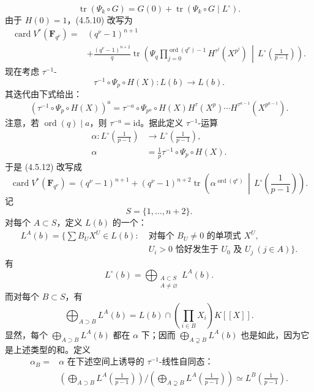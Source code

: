 \[
\operatorname{tr}(\Psi_k\circ G)=G(0)+\operatorname{tr}(\Psi_k\circ G\mid L^\circ).\tag{4.5.11}
\]
由于 $H(0)=1$，(4.5.10) 改写为
\[
\begin{aligned}
\operatorname{card}V^*(\mathbf F_{q^\nu})
={}&(q^\nu-1)^{n+1}\\
&+\frac{(q^\nu-1)^{n+2}}q\operatorname{tr}\left(
\Psi_q\prod_{j=0}^{\operatorname{ord}(q^\nu)-1}H^{\tau^j}(X^{p^j})\,\middle|\,
L^\circ\left(\frac1{p-1}\right)\right).
\end{aligned}\tag{4.5.12}
\]
现在考虑 $\tau^{-1}$-
\[
\tau^{-1}\circ\Psi_p\circ H(X):L(b)\longrightarrow L(b).\tag{4.5.13}
\]
其迭代由下式给出：
\[
(\tau^{-1}\circ\Psi_p\circ H(X))^a
=\tau^{-a}\circ\Psi_{p^a}\circ H(X)H^\tau(X^p)\cdots H^{\tau^{a-1}}(X^{p^{a-1}}).\tag{5.4.14}
\]
注意，若 $\operatorname{ord}(q)\mid a$，则 $\tau^{-a}=\mathrm{id}$。据此定义 $\tau^{-1}$-运算
\[
\begin{aligned}
\alpha:L^\circ\left(\frac1{p-1}\right)&\longrightarrow L^\circ\left(\frac1{p-1}\right),\\
\alpha&=\frac1p\tau^{-1}\circ\Psi_p\circ H(X).
\end{aligned}\tag{4.5.15}
\]
于是 (4.5.12) 改写成
\[
\operatorname{card}V^*(\mathbf F_{q^\nu})=(q^\nu-1)^{n+1}
+(q^\nu-1)^{n+2}\operatorname{tr}\left(\alpha^{\operatorname{ord}(q^\nu)}\,\middle|\,
L^\circ\left(\frac1{p-1}\right)\right).\tag{4.5.16}
\]
记
\[
S=\{1,\ldots,n+2\}.\tag{4.5.17}
\]
对每个 $A\subset S$，定义 $L(b)$ 的一个：
\[
\begin{split}
L^A(b)=\bigl\{\textstyle\sum B_UX^U\in L(b):\;&\text{对每个 }B_U\ne0\text{ 的单项式 }X^U,\\
&U_i>0\text{ 恰好发生于 }U_0\text{ 及 }U_j\ (j\in A)\bigr\}.
\end{split}\tag{4.5.18}
\]
有
\[
L^\circ(b)=\bigoplus_{\substack{A\subset S\\A\ne\varnothing}}L^A(b).\tag{4.5.19}
\]
而对每个 $B\subset S$，有
\[
\bigoplus_{A\supset B}L^A(b)
=L(b)\cap\left(\prod_{i\in B}X_i\right)K[[X]].\tag{4.5.20}
\]
显然，每个 $\bigoplus_{A\supset B}L^A(b)$ 都在 $\alpha$ 下；因而 $\bigoplus_{A\supsetneq B}L^A(b)$ 也是如此，因为它是上述类型的和。定义
\[
\begin{split}
\alpha_B={}&\alpha\text{ 在下述空间上诱导的 }\tau^{-1}\text{-线性自同态：}\\
&\left(\bigoplus_{A\supset B}L^A\left(\frac1{p-1}\right)\right)
\Big/\left(\bigoplus_{A\supsetneq B}L^A\left(\frac1{p-1}\right)\right)
\simeq L^B\left(\frac1{p-1}\right).
\end{split}\tag{4.5.21}
\]
